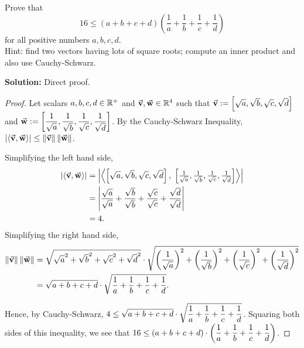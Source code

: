 Prove that
    \[
        16 \le (a+b+c+d)\left(\frac{1}{a} + \frac{1}{b} + \frac{1}{c} + \frac{1}{d} \right)
    \]
    for all positive numbers $a,b,c,d$.\\
    Hint: find two vectors having lots of square roots; compute an inner product and also use Cauchy-Schwarz.
    \begin{mybox}\textbf{Solution:} Direct proof.
    \begin{proof}
        Let scalars $a,b,c,d \in \R^+$ and $\bv, \bw \in \R^4$ such that $\bv := \brac{\sqrt{a}, \sqrt{b}, \sqrt{c}, \sqrt{d}}$ and $\displaystyle \bw := \brac{\over{\sqrt{a}},\over{\sqrt{b}}, \over{\sqrt{c}}, \over{\sqrt{d}}}$. By the Cauchy-Schwarz Inequality, $\abs{\inner{\bv,\bw}} \leq \norm{\bv} \norm{\bw}$.

        \noindent Simplifying the left hand side,
        \begin{align*}
            \abs{\inner{\bv,\bw}} &= \abs{\inner{\brac{\sqrt{a}, \sqrt{b}, \sqrt{c}, \sqrt{d}},\; \textstyle \brac{\over{\sqrt{a}},\over{\sqrt{b}}, \over{\sqrt{c}}, \over{\sqrt{d}}}}  }\\
            &= \abs{ \frac{\sqrt{a}}{\sqrt{a}} + \frac{\sqrt{b}}{\sqrt{b}} + \frac{\sqrt{c}}{\sqrt{c}} + \frac{\sqrt{d}}{\sqrt{d}} }\\
            &= 4.
        \end{align*}
        Simplifying the right hand side,
        \begin{align*}
            \norm{\bv} \norm{\bw} &=  \sqrt{\prt a^2 + \prt b^2 + \prt c^2 + \prt d^2 } \cdot \sqrt{ \port a^2 + \port b^2 + \port c^2 + \port d^2 } \\
            &= \sqrt{a + b + c + d} \cdot \sqrt{\over{a}+\over b + \over c + \over d}.
        \end{align*}

        \noindent Hence, by Cauchy-Schwarz, $\displaystyle 4 \leq   \sqrt{a + b + c + d} \cdot \sqrt{\over{a}+\over b + \over c + \over d}$. Squaring both sides of this inequality, we see that $\displaystyle 16 \leq (a + b + c + d) \cdot \pars{\over{a}+\over b + \over c + \over d}$.
    \end{proof}
\end{mybox}